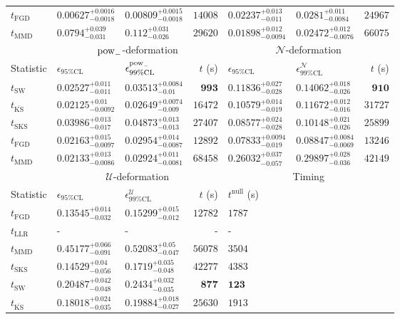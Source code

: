 \begin{tabular}{l|llr|llr}
	$t_{\mathrm{FGD}}$ & ${\mathbf{0.00627_{-0.0018}^{+0.0016}}}$ & ${\mathbf{0.00809_{-0.0018}^{+0.0015}}}$ & $14008$ & $0.02237_{-0.011}^{+0.013}$ & $0.0281_{-0.0084}^{+0.011}$ & $24967$ \\
	$t_{\mathrm{MMD}}$ & $0.0794_{-0.031}^{+0.039}$ & $0.112_{-0.026}^{+0.031}$ & $29620$ & ${\mathbf{0.01898_{-0.0094}^{+0.012}}}$ & ${\mathbf{0.02472_{-0.0076}^{+0.012}}}$ & $66075$ \\
	\toprule
	\multicolumn{1}{c}{} & \multicolumn{3}{c}{$\rm{pow}_{-}$-deformation} & \multicolumn{3}{c}{$\mathcal{N}$-deformation} \\
	Statistic & $\epsilon_{95\%\mathrm{CL}}$ & $\epsilon^  {\rm{pow}_{-}}_{99\%\mathrm{CL}}$ & $t$ (s) & $\epsilon_{95\%\mathrm{CL}}$ & $\epsilon^    {\mathcal{N}}_{99\%\mathrm{CL}}$ & $t$ (s) \\
	\midrule
	$t_{\mathrm{SW}}$ & $0.02527_{-0.011}^{+0.011}$ & $0.03513_{-0.01}^{+0.0084}$ & ${\mathbf{993}}$ & $0.11836_{-0.028}^{+0.027}$ & $0.14062_{-0.026}^{+0.018}$ & ${\mathbf{910}}$ \\
	$t_{\overline{\mathrm{KS}}}$ & ${\mathbf{0.02125_{-0.0092}^{+0.01}}}$ & ${\mathbf{0.02649_{-0.009}^{+0.0074}}}$ & $16472$ & $0.10579_{-0.019}^{+0.014}$ & $0.11672_{-0.016}^{+0.012}$ & $31727$ \\
	$t_{\mathrm{SKS}}$ & $0.03986_{-0.017}^{+0.013}$ & $0.04873_{-0.013}^{+0.013}$ & $27407$ & $0.08577_{-0.028}^{+0.024}$ & $0.10148_{-0.026}^{+0.021}$ & $25899$ \\
	$t_{\mathrm{FGD}}$ & $0.02163_{-0.0097}^{+0.015}$ & $0.02954_{-0.0087}^{+0.014}$ & $12892$ & ${\mathbf{0.07833_{-0.019}^{+0.0094}}}$ & ${\mathbf{0.08847_{-0.0069}^{+0.0084}}}$ & $13246$ \\
	$t_{\mathrm{MMD}}$ & $0.02133_{-0.0086}^{+0.013}$ & $0.02924_{-0.0081}^{+0.011}$ & $68458$ & $0.26032_{-0.057}^{+0.037}$ & $0.29897_{-0.036}^{+0.028}$ & $42149$ \\
	\toprule
	\multicolumn{1}{c}{} & \multicolumn{3}{c}{$\mathcal{U}$-deformation} & \multicolumn{3}{c}{Timing} \\
	Statistic & $\epsilon_{95\%\mathrm{CL}}$ & $\epsilon^    {\mathcal{U}}_{99\%\mathrm{CL}}$ & $t$ (s) & $t^{\mathrm{null}}$ (s) \\
	\midrule
	$t_{\mathrm{FGD}}$ & ${\mathbf{0.13545_{-0.032}^{+0.014}}}$ & ${\mathbf{0.15299_{-0.012}^{+0.015}}}$ & $12782$ & $1787$ \\
	$t_{\mathrm{LLR}}$ & - & - & - & - \\
	$t_{\mathrm{MMD}}$ & $0.45177_{-0.091}^{+0.066}$ & $0.52083_{-0.047}^{+0.05}$ & $56078$ & $3504$ \\
	$t_{\mathrm{SKS}}$ & $0.14529_{-0.056}^{+0.04}$ & $0.1719_{-0.048}^{+0.035}$ & $42277$ & $4383$ \\
	$t_{\mathrm{SW}}$ & $0.20487_{-0.048}^{+0.042}$ & $0.2434_{-0.035}^{+0.032}$ & ${\mathbf{877}}$ & ${\mathbf{123}}$ \\
	$t_{\overline{\mathrm{KS}}}$ & $0.18018_{-0.035}^{+0.024}$ & $0.19884_{-0.027}^{+0.018}$ & $25630$ & $1913$ \\
	\bottomrule
\end{tabular}